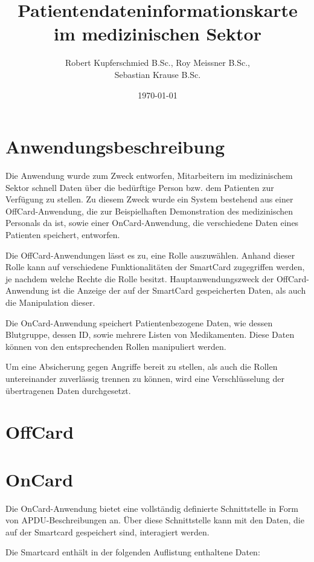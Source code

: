 \documentclass[parskip]{scrartcl}
\begin{document}
\subject{Projektdokumentation im Modul Smartcard}
\title{Patientendateninformationskarte im medizinischen Sektor}
\author{Robert Kupferschmied B.Sc., Roy Meissner B.Sc.,\\Sebastian Krause B.Sc.}
\date{\today}

\maketitle
\onehalfspacing
\section{Anwendungsbeschreibung}
	Die Anwendung wurde zum Zweck entworfen, Mitarbeitern im medizinischem Sektor schnell Daten über die bedürftige Person bzw. dem Patienten zur Verfügung zu stellen. Zu diesem Zweck wurde ein System bestehend aus einer OffCard-Anwendung, die zur Beispielhaften Demonstration des medizinischen Personals da ist, sowie einer OnCard-Anwendung, die verschiedene Daten eines Patienten speichert, entworfen.
	
	Die OffCard-Anwendungen lässt es zu, eine Rolle auszuwählen. Anhand dieser Rolle kann auf verschiedene Funktionalitäten der SmartCard zugegriffen werden, je nachdem welche Rechte die Rolle besitzt. Hauptanwendungszweck der OffCard-Anwendung ist die Anzeige der auf der SmartCard gespeicherten Daten, als auch die Manipulation dieser.
	
	Die OnCard-Anwendung speichert Patientenbezogene Daten, wie dessen Blutgruppe, dessen ID, sowie mehrere Listen von Medikamenten. Diese Daten können von den entsprechenden Rollen manipuliert werden.
	
	Um eine Absicherung gegen Angriffe bereit zu stellen, als auch die Rollen untereinander zuverlässig trennen zu können, wird eine Verschlüsselung der übertragenen Daten durchgesetzt.
\section{OffCard}
\section{OnCard}
	Die OnCard-Anwendung bietet eine vollständig definierte Schnittstelle in Form von APDU-Beschreibungen an. Über diese Schnittstelle kann mit den Daten, die auf der Smartcard gespeichert sind, interagiert werden.
	
	Die Smartcard enthält in der folgenden Auflistung enthaltene Daten:
	
\end{document}
